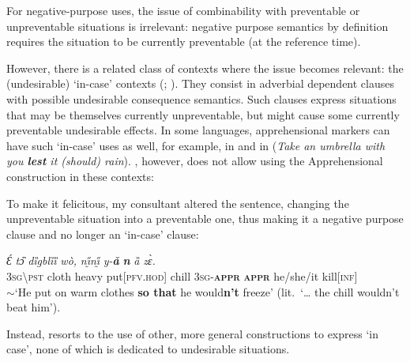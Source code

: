 \documentclass[output=paper,colorlinks,citecolor=brown]{langscibook}
\begin{document}
For negative-purpose uses, the issue of combinability with preventable or unpreventable situations is irrelevant: negative purpose semantics by definition requires the situation to be currently preventable (at the reference time).

However, there is a related class of contexts where the issue becomes relevant: the (undesirable) `in-case' contexts (\cite[297--298]{lichtenberk1995}; \cite[279--280]{vuillermet2018}). They consist in adverbial dependent clauses with possible undesirable consequence semantics. Such clauses express situations that may be themselves currently unpreventable, but might cause some currently preventable undesirable effects. In some languages, apprehensional markers can have such `in-case' uses as well, for example, in  \parencite[301]{lichtenberk1995} and in  (\textit{Take an umbrella with you \textbf{lest} it (should) rain}). , however, does not allow using the Apprehensional construction in these contexts:

\z

To make it felicitous, my consultant altered the sentence, changing the unpreventable situation into a preventable one, thus making it a negative purpose clause and no longer an `in-case' clause:


\ea \label{ex:Fed66prime}
\gll \textit{Ɛ́} \textit{tɔ̏} \textit{dȉgblȉȉ} \textit{wò,} \textit{nı̰̋nı̰̋} \textit{y-\textbf{ǎ}} \textit{\textbf{n{\ù}}} \textit{ȁ} \textit{zɛ̀.} \\
\textsc{3sg\backslash pst} cloth heavy put\textsc{[pfv.hod]} chill \textsc{3sg-\textbf{appr}} \textsc{\textbf{appr}} he/she/it kill[\textsc{inf}] \\
\glt $\sim$`He put on warm clothes \textbf{so that} he would\textbf{n't} freeze' (lit.\ `{\dots} the chill wouldn't beat him').
\z

\noindent Instead,  resorts to the use of other, more general constructions to express `in case', none of which is dedicated to undesirable situations.
\end{document}
